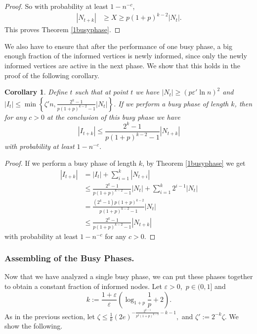 \documentclass[12pt]{article}
\newtheorem{cor}[theorem]{Corollary}
\newcommand{\e}{\varepsilon}
\begin{document}
{\begin{proof}
So with probability at least $1 - n^{-c}$,
\begin{align*}
|N_{t+k}| &\geq X \geq p(1+p)^{k-2}|N_t|.
\end{align*}
This proves Theorem \ref{1busyphase}.
\end{proof}


We also have to ensure that after the performance of one busy phase, a big enough fraction of the informed vertices is newly informed, since only the newly informed vertices are active in the next phase. We show that this holds in the proof of the following corollary.


\begin{cor}\label{OneBusyPhase2}
Define $t$ such that at point $t$ we have $|N_{t}|\geq (p\e'\ln n)^2$ and $|I_{t}|\leq \min\left\{\zeta' n , \frac{2^k-1}{p(1+p)^{k-2}-1}|N_{t}|\right\}$.
If we perform a busy phase of length $k$, then for any $c >0$ at the conclusion of this busy phase we have
\begin{equation*}
 |I_{t+k}|\leq \frac{2^k-1}{p(1+p)^{k-2}-1}|N_{t+k}|
\end{equation*}
with probability at least $1 - n^{-c}$.
\end{cor}
\begin{proof}
If we perform a busy phase of length $k$, by Theorem \ref{1busyphase} we get
\begin{align*}
 |I_{t+k}| &= |I_t|+\sum_{i=1}^k|N_{t+i}|\\
&\leq \frac{2^k-1}{p(1+p)^{k-2}-1}|N_{t}|+\sum_{i=1}^k2^{i-1}|N_t| \\
& = \frac{(2^k-1)p(1+p)^{k-2}}{p(1+p)^{k-2}-1}|N_t|\\
&\leq \frac{2^k-1}{p(1+p)^{k-2}-1}|N_{t+k}|
\end{align*}
with probability at least $1 - n^{-c}$ for any $c >0$.
\end{proof}



\subsubsection{Assembling of the Busy Phases.}

Now that we have analyzed a single busy phase, we can put these phases together to obtain a constant fraction of informed nodes.
Let $\e > 0$,~$p \in (0,1]$ and $$k := \frac{1+\e}{\e}\left(\log_{1+p}\frac{1}{p} + 2\right).$$
As in the previous section, let
$\zeta \leq \frac{1}{k}(2e)^{-\frac{2^{k-1}}{p^3(1+p)^{k-3}} - k - 1},$ 
and $\zeta' := 2^{-k}\zeta$. 
We show the following.

}
\end{document}
